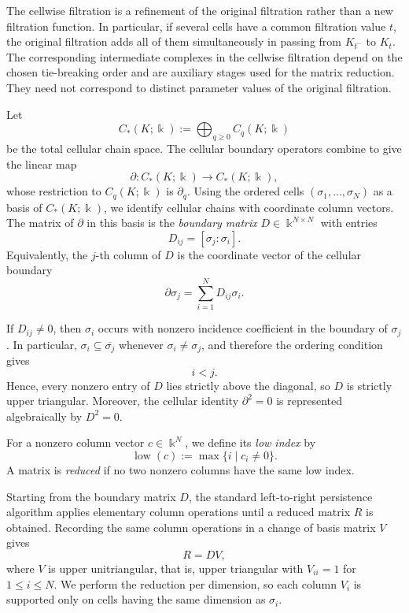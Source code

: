 \documentclass[11pt]{article}
\theoremstyle{paperdefinition}
\theoremstyle{paperplain}
\theoremstyle{paperremark}
\begin{document}
The cellwise filtration is a refinement of the original filtration rather than a new filtration function. In particular, if several cells have a common filtration value $t$, the original filtration adds all of them simultaneously in passing from
$K_{t^-}$ to $K_t$. The corresponding intermediate complexes in the cellwise filtration depend on the chosen tie-breaking order and are auxiliary stages used for the matrix reduction. They need not correspond to distinct parameter values of the original filtration.

Let
\[
C_*(K;\Bbbk) := \bigoplus_{q\geq0} C_q(K;\Bbbk)
\]
be the total cellular chain space. The cellular boundary operators combine to give the linear map
\[
\partial:C_*(K;\Bbbk)\longrightarrow C_*(K;\Bbbk),
\]
whose restriction to $C_q(K;\Bbbk)$ is $\partial_q$. Using the ordered cells $(\sigma_1,\ldots,\sigma_N)$ as a basis of $C_*(K;\Bbbk)$, we identify cellular chains with coordinate column vectors. The matrix of $\partial$ in this basis is the \emph{boundary matrix} $D\in\Bbbk^{N\times N}$ with entries
\[
D_{ij} = [\sigma_j:\sigma_i].
\]
Equivalently, the $j$-th column of $D$ is the coordinate vector of the cellular boundary
\[
\partial\sigma_j = \sum_{i=1}^{N}D_{ij}\sigma_i.
\]

If $D_{ij}\neq0$, then $\sigma_i$ occurs with nonzero incidence coefficient in the boundary of $\sigma_j$. In particular,
$\sigma_i\subseteq\overline{\sigma_j}$ whenever $\sigma_i\neq\sigma_j$, and therefore the ordering condition gives
\[
i<j.
\]
Hence, every nonzero entry of $D$ lies strictly above the diagonal, so $D$ is strictly upper triangular. Moreover, the cellular identity $\partial^2=0$ is represented algebraically by $D^2=0$.

For a nonzero column vector $c\in\Bbbk^N$, we define its \emph{low index} by
\[
\operatorname{low}(c) := \max\{i\mid c_i\neq0\}.
\]
A matrix is \emph{reduced} if no two nonzero columns have the same low index.

Starting from the boundary matrix $D$, the standard left-to-right persistence algorithm applies elementary column operations until a reduced matrix $R$ is obtained. Recording the same column operations in a change of basis matrix $V$ gives
\begin{equation}
\label{eq:RDV}
R=DV,
\end{equation}
where $V$ is upper unitriangular, that is, upper triangular with $V_{ii}=1$ for $1\leq i\leq N$. We perform the reduction per dimension, so each column $V_i$ is supported only on cells having the same dimension as $\sigma_i$.
\end{document}

